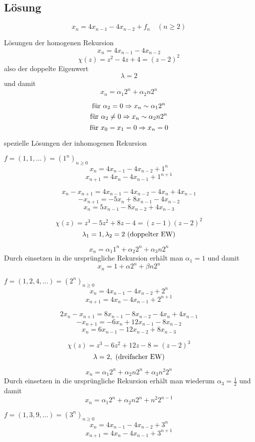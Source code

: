 \subsection*{Lösung}
\[ x_{n} = 4x_{n-1} - 4x_{n-2} + f_{n} \quad (n\geq 2) \]
\begin{flushenum}
\item
  Lösungen der homogenen Rekursion
  \[ x_{n} = 4x_{n-1} - 4x_{n-2} \]
  \[ \chi(z) = z^{2} - 4z + 4 = (z - 2)^{2} \]
  also der doppelte Eigenwert
  \[ \lambda = 2 \]
  und damit
  \[ x_{n} = \alpha_{1}2^{n} + \alpha_{2}n2^{n} \]

  \[ \textnormal{für } \alpha_{2} = 0 \Rightarrow x_{n} \sim \alpha_{1}2^{n} \]
  \[ \textnormal{für } \alpha_{2} \not= 0 \Rightarrow x_{n} \sim \alpha_{2}n2^{n} \]
  \[ \textnormal{für } x_{0} = x_{1} = 0 \Rightarrow x_{n} = 0 \]
\item
  spezielle Lösungen der inhomogenen Rekursion
  \begin{flushalpha}
    \item $f = (1, 1, \dots) = (1^{n})_{n\geq 0}$
      \[ x_{n} = 4x_{n-1} - 4x_{n-2} + 1^{n} \]
      \[ x_{n+1} = 4x_{n} - 4x_{n-1} + 1^{n+1} \]

      \[ x_{n} - x_{n+1} = 4x_{n-1} - 4x_{n-2} - 4x_{n} + 4x_{n-1} \]
      \[ -x_{n+1} = -5x_{n} + 8x_{n-1} - 4x_{n-2} \]
      \[ x_{n} = 5x_{n-1} - 8x_{n-2} + 4x_{n-3} \]

      \[ \chi(z) = z^{3} - 5z^{2} + 8z -  4 = (z - 1) (z - 2)^{2} \]
      \[ \lambda_{1} = 1, \lambda_{2} = 2 \textnormal{ (doppelter EW)} \]

      \[ x_{n} = \alpha_{1}1^{n} + \alpha_{2}2^{n} + \alpha_{3}n2^{n} \]
      Durch einsetzen in die ursprüngliche Rekursion erhält man $\alpha_{1} =
      1$ und damit
      \[ x_{n} = 1 + \alpha 2^{n} + \beta n2^{n} \]
    \item $f = (1, 2, 4, \dots) = (2^{n})_{n\geq 0}$
      \[ x_{n} = 4x_{n-1} - 4x_{n-2} + 2^{n} \]
      \[ x_{n+1} = 4x_{n} - 4x_{n-1} + 2^{n+1} \]

      \[ 2x_{n} - x_{n+1} = 8x_{n-1} - 8x_{n-2} - 4x_{n} + 4x_{n-1} \]
      \[ -x_{n+1} = -6x_{n} + 12x_{n-1} - 8x_{n-2} \]
      \[ x_{n} = 6x_{n-1} - 12x_{n-2} + 8x_{n-3} \]

      \[ \chi(z) = z^{3} - 6z^{2} + 12z - 8 = (z - 2)^{3} \]
      \[ \lambda = 2, \textnormal{ (dreifacher EW)} \]

      \[ x_{n} = \alpha_{1}2^{n} + \alpha_{2}n2^{n} + \alpha_{3}n^{2}2^{n} \]
      Durch einsetzen in die ursprüngliche Rekursion erhält man wiederum
      $\alpha_{3} = \frac{1}{2}$ und damit
      \[ x_{n} = \alpha_1 2^{n} + \alpha_2 n2^{n} + n^{2}2^{n-1}\]
    \item $f = (1, 3, 9, \dots) = (3^{n})_{n\geq 0}$
      \[ x_{n} = 4x_{n-1} - 4x_{n-2} + 3^{n} \]
      \[ x_{n+1} = 4x_{n} - 4x_{n-1} + 3^{n+1} \]


\end{flushalpha}
\end{flushenum}
